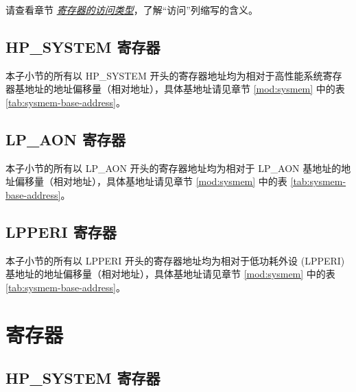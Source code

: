 \documentclass[main\_\_CN.tex]{subfiles}
\begin{document}
请查看章节 \hyperref[glossary-access-types]{\textit{寄存器的访问类型}}，了解“访问”列缩写的含义。

\subsection{HP\_SYSTEM 寄存器}
\label{sec:sysreg-reg-summ-sysreg}

本子小节的所有以 HP\_SYSTEM 开头的寄存器地址均为相对于高性能系统寄存器基地址的地址偏移量（相对地址），具体基地址请见章节 \ref{mod:sysmem} \textit{} 中的表 \ref{tab:sysmem-base-address}。



\subsection{LP\_AON 寄存器}
\label{sec:sysreg-reg-summ-lpaon}

本子小节的所有以 LP\_AON 开头的寄存器地址均为相对于 LP\_AON 基地址的地址偏移量（相对地址），具体基地址请见章节 \ref{mod:sysmem} \textit{} 中的表 \ref{tab:sysmem-base-address}。



\subsection{LPPERI 寄存器}
\label{sec:sysreg-reg-summ-lpperi}

本子小节的所有以 LPPERI 开头的寄存器地址均为相对于低功耗外设 (LPPERI) 基地址的地址偏移量（相对地址），具体基地址请见章节 \ref{mod:sysmem} \textit{} 中的表 \ref{tab:sysmem-base-address}。





\clearpage
\section{寄存器}

\subsection{HP\_SYSTEM 寄存器}
\label{sec:sysreg-reg-sysreg}
\end{document}
